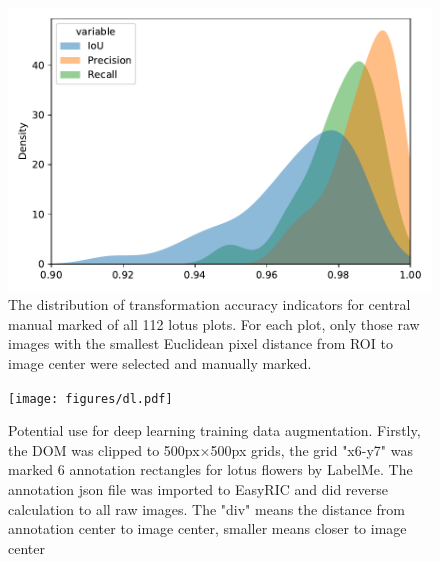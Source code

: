 \documentclass{configs/bmcart}
\begin{document}
\begin{backmatter}
\begin{figure}[!htb]
  \includegraphics[width=0.95\linewidth]{figures/iou_all.pdf}
  \caption{The distribution of transformation accuracy indicators for central manual marked of all 112 lotus plots. For each plot, only those raw images with the smallest Euclidean pixel distance from ROI to image center were selected and manually marked.}
  \label{fig:iou_all}
\end{figure}

\begin{figure}[!htb]
  \texttt{[image: figures/dl.pdf]}
  \caption{Potential use for deep learning training data augmentation. Firstly, the DOM was clipped to 500px$\times$500px grids, the grid "x6-y7" was marked 6 annotation rectangles for lotus flowers by LabelMe. The annotation json file was imported to EasyRIC and did reverse calculation to all raw images. The "div" means the distance from annotation center to image center, smaller means closer to image center}
  \label{fig:dl}
\end{figure}

\end{backmatter}
\end{document}
